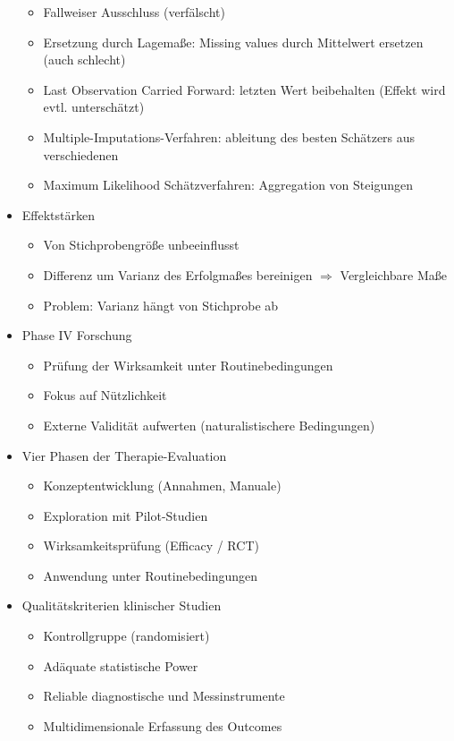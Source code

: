 \documentclass[11pt, paper=a4, twocolumn]{scrartcl}
\begin{document}
\begin{itemize}
\begin{itemize}
					\item Fallweiser Ausschluss (verfälscht)
					\item Ersetzung durch Lagemaße: Missing values durch Mittelwert ersetzen (auch schlecht)
					\item Last Observation Carried Forward: letzten Wert beibehalten (Effekt wird evtl. unterschätzt)
					\item Multiple-Imputations-Verfahren: ableitung des besten Schätzers aus verschiedenen
					\item Maximum Likelihood Schätzverfahren: Aggregation von Steigungen
				\end{itemize}
			\item Effektstärken
				\begin{itemize}
					\item Von Stichprobengröße unbeeinflusst
					\item Differenz um Varianz des Erfolgmaßes bereinigen $\Rightarrow$ Vergleichbare Maße
					\item Problem: Varianz hängt von Stichprobe ab
				\end{itemize}
			\item Phase IV Forschung
				\begin{itemize}
					\item Prüfung der Wirksamkeit unter Routinebedingungen
					\item Fokus auf Nützlichkeit
					\item Externe Validität aufwerten (naturalistischere Bedingungen)
				\end{itemize}
			\item Vier Phasen der Therapie-Evaluation
				\begin{itemize}
					\item Konzeptentwicklung (Annahmen, Manuale)
					\item Exploration mit Pilot-Studien
					\item Wirksamkeitsprüfung (Efficacy / RCT)
					\item Anwendung unter Routinebedingungen
				\end{itemize}
			\item Qualitätskriterien klinischer Studien
				\begin{itemize}
					\item Kontrollgruppe (randomisiert)
					\item Adäquate statistische Power
					\item Reliable diagnostische und Messinstrumente
					\item Multidimensionale Erfassung des Outcomes

\end{itemize}
\end{itemize}
\end{document}

